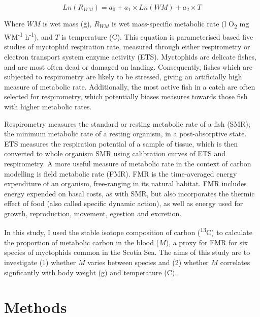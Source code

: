 \documentclass[12pt, titlepage]{article}
\begin{document}
\begin{equation}
Ln(R_{WM}) = a_{0} + a_{1} \times Ln(WM) + a_{2} \times T
\end{equation}

\noindent Where $WM$ is wet mass (g),  $R_{WM}$ is wet mass-specific metabolic rate (\textmu l O\textsubscript{2} mg WM\textsuperscript{-1} h\textsuperscript{-1}), and $T$ is temperature (\textdegree C).
This equation is parameterised based five studies of myctophid respiration rate, measured through either respirometry or electron transport system enzyme activity (ETS). %
Myctophids are delicate fishes, and are most often dead or damaged on landing.
Consequently, fishes which are subjected to respirometry are likely to be stressed, giving an artificially high measure of metabolic rate.
Additionally, the most active fish in a catch are often selected for respirometry, which potentially biases measures towards those fish with higher metabolic rates. %

Respirometry measures the standard or resting metabolic rate of a fish (SMR); the minimum metabolic rate of a resting organism, in a post-absorptive state. %
ETS measures the respiration potential of a sample of tissue, which is then converted to whole organism SMR using calibration curves of ETS and respirometry. %
A more useful measure of metabolic rate in the context of carbon modelling is field metabolic rate (FMR).
FMR is the time-averaged energy expenditure of an organism, free-ranging in its natural habitat.
FMR includes energy expended on basal costs, as with SMR, but also incorporates the thermic effect of food (also called specific dynamic action), as well as energy used for growth, reproduction, movement, egestion and excretion. %

In this study, I used the stable isotope composition of carbon (\textdelta \textsuperscript{13}C) to calculate the proportion of metabolic carbon in the blood ($M$), a proxy for FMR %
for six species of myctophids common in the Scotia Sea. %
The aims of this study are to investigate (1) whether $M$ varies between species and (2) whether $M$ correlates signficantly with body weight (g) and temperature (\textdegree C).

\section{Methods}
\end{document}
